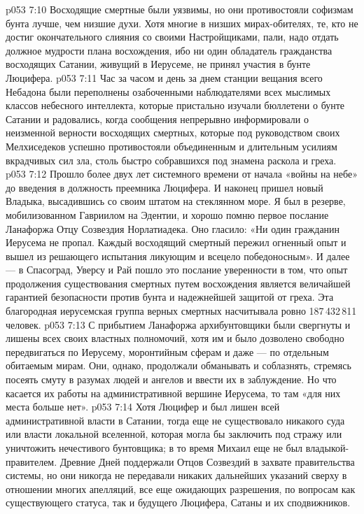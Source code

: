 \vs p053 7:10 \pc Восходящие смертные были уязвимы, но они противостояли софизмам бунта лучше, чем низшие духи. Хотя многие в низших мирах\hyp{}обителях, те, кто не достиг окончательного слияния со своими Настройщиками, пали, надо отдать должное мудрости плана восхождения, ибо ни один обладатель гражданства восходящих Сатании, живущий в Иерусеме, не принял участия в бунте Люцифера.
\vs p053 7:11 Час за часом и день за днем станции вещания всего Небадона были переполнены озабоченными наблюдателями всех мыслимых классов небесного интеллекта, которые пристально изучали бюллетени о бунте Сатании и радовались, когда сообщения непрерывно информировали о неизменной верности восходящих смертных, которые под руководством своих Мелхиседеков успешно противостояли объединенным и длительным усилиям вкрадчивых сил зла, столь быстро собравшихся под знамена раскола и греха.
\vs p053 7:12 Прошло более двух лет системного времени от начала «войны на небе» до введения в должность преемника Люцифера. И наконец пришел новый Владыка, высадившись со своим штатом на стеклянном море. Я был в резерве, мобилизованном Гавриилом на Эдентии, и хорошо помню первое послание Ланафоржа Отцу Созвездия Норлатиадека. Оно гласило: «Ни один гражданин Иерусема не пропал. Каждый восходящий смертный пережил огненный опыт и вышел из решающего испытания ликующим и всецело победоносным». И далее --- в Спасоград, Уверсу и Рай пошло это послание уверенности в том, что опыт продолжения существования смертных путем восхождения является величайшей гарантией безопасности против бунта и надежнейшей защитой от греха. Эта благородная иерусемская группа верных смертных насчитывала ровно 187\,432\,811 человек.
\vs p053 7:13 \pc С прибытием Ланафоржа архибунтовщики были свергнуты и лишены всех своих властных полномочий, хотя им и было дозволено свободно передвигаться по Иерусему, моронтийным сферам и даже --- по отдельным обитаемым мирам. Они, однако, продолжали обманывать и соблазнять, стремясь посеять смуту в разумах людей и ангелов и ввести их в заблуждение. Но что касается их работы на административной вершине Иерусема, то там «для них места больше нет».
\vs p053 7:14 \pc Хотя Люцифер и был лишен всей административной власти в Сатании, тогда еще не существовало никакого суда или власти локальной вселенной, которая могла бы заключить под стражу или уничтожить нечестивого бунтовщика; в то время Михаил еще не был владыкой\hyp{}правителем. Древние Дней поддержали Отцов Созвездий в захвате правительства системы, но они никогда не передавали никаких дальнейших указаний сверху в отношении многих апелляций, все еще ожидающих разрешения, по вопросам как существующего статуса, так и будущего Люцифера, Сатаны и их сподвижников.
